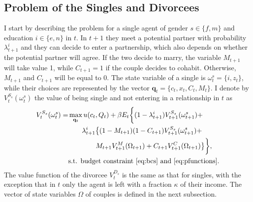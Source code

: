 \documentclass[12pt]{article}
\begin{document}
\subsection{Problem of the Singles and Divorcees}
I start by describing the problem for a single agent of gender $s\in\{f,m\}$ and education $i\in\{e,n\}$ in $t$. In $t+1$ they meet a potential partner with probability $\lambda^i_{t+1}$ and they can decide to enter a partnership, which also depends on whether the potential partner will agree. If the two decide to marry, the variable $M_{t+1}$ will take value 1, while $C_{t+1}=1$ if the couple decides to cohabit. Otherwise, $M_{t+1}$ and $C_{t+1}$ will be equal to 0. The state variable of a single is $\omega^s_t=\{i,z_t\}$, while their choices are represented by the vector $\mathbf{q}_t=\{c_t,x_t,C_t,M_t\}$. I denote by $V_t^{S_s}(\omega^s_t)$ the value of being single and not entering in a relationship in $t$ as
\begin{equation}\label{eq:v_single}
\begin{split}
V_t^{S_s}(\omega^s_t)=&\max_{\mathbf{q}_t} u(c_t,Q_t)+\beta E_t \bigg\{(1-\lambda^i_{t+1})V^{S_s}_{t+1}(\omega^s_{t+1})+\\ & \quad\quad \lambda^i_{t+1}\big\{(1-M_{t+1})(1-C_{t+1})	V^{S_s}_{t+1}(\omega^s_{t+1})+\\ &\quad\quad\quad\quad M_{t+1} V^{M}_{t+1}(\Omega_{t+1})+ C_{t+1} V^{C}_{t+1}(\Omega_{t+1}) \big\}\bigg\},
\\ &\text{s.t. budget constraint \eqref{eq:bcs} and \eqref{eq:pfunctions}.} 
\end{split}
\end{equation}
The value function of the divorcee $V_t^{D_s}$ is the same as that for singles, with the exception that in $t$ only the agent is left with a fraction $\kappa$ of their income. The vector of state variables $\Omega$ of couples is defined in the next subsection.
\end{document}
